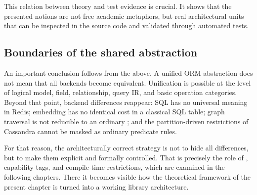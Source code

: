 This relation between theory and test evidence is crucial. It shows that the presented notions are not free academic metaphors, but real architectural units that can be inspected in the source code and validated through automated tests.

\subsection{Boundaries of the shared abstraction}

An important conclusion follows from the above. A unified ORM abstraction does not mean that all backends become equivalent. Unification is possible at the level of logical model, field, relationship, query IR, and basic operation categories. Beyond that point, backend differences reappear: SQL  has no universal meaning in Redis; embedding has no identical cost in a classical SQL table; graph traversal is not reducible to an ordinary ; and the partition-driven restrictions of Cassandra cannot be masked as ordinary predicate rules.

For that reason, the architecturally correct strategy is not to hide all differences, but to make them explicit and formally controlled. That is precisely the role of , capability tags, and compile-time restrictions, which are examined in the following chapters. There it becomes visible how the theoretical framework of the present chapter is turned into a working library architecture.
